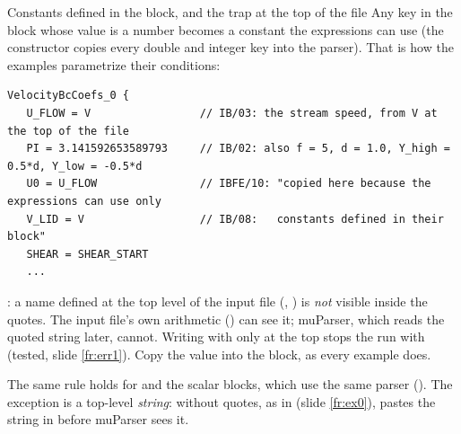 \documentclass[aspectratio=169,11pt]{beamer}
\begin{document}
\begin{frame}[fragile]{Constants defined in the block, and the trap at the top of the file}
\label{fr:blockconst}
\small Any key in the block whose value is a number becomes a constant the expressions can use (the constructor copies every double and integer key into the parser). That is how the examples parametrize their conditions:
\begin{lstlisting}[style=inputtiny]
VelocityBcCoefs_0 {
   U_FLOW = V                 // IB/03: the stream speed, from V at the top of the file
   PI = 3.141592653589793     // IB/02: also f = 5, d = 1.0, Y_high = 0.5*d, Y_low = -0.5*d
   U0 = U_FLOW                // IBFE/10: "copied here because the expressions can use only
   V_LID = V                  // IB/08:   constants defined in their block"
   SHEAR = SHEAR_START
   ...
\end{lstlisting}
\begin{punchbox}
\footnotesize {}: a name defined at the top level of the input file (, ) is \emph{not} visible inside the quotes. The input file's own arithmetic () can see it; muParser, which reads the quoted string later, cannot. Writing  with  only at the top stops the run with  (tested, slide \ref{fr:err1}). Copy the value into the block, as every example does.
\end{punchbox}
\footnotesize The same rule holds for  and the scalar blocks, which use the same parser (). The exception is a top-level \emph{string}:  without quotes, as in  (slide \ref{fr:ex0}), pastes the string in before muParser sees it.
\end{frame}
\end{document}
